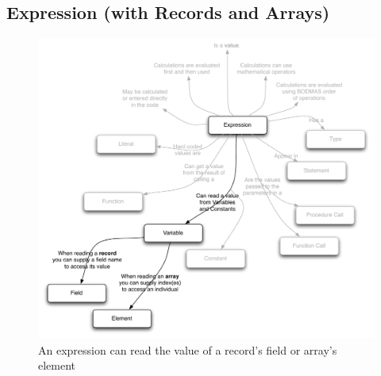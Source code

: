 \clearpage
\subsection{Expression (with Records and Arrays)} %
\label{sub:expression_with_records_and_arrays_}

\begin{figure}[h]
   \centering
   \includegraphics[width=\textwidth]{./topics/type-decl/diagrams/Expression} 
   \caption{An expression can read the value of a record's field or array's element}
   \label{fig:type-decl-expression}
\end{figure}

